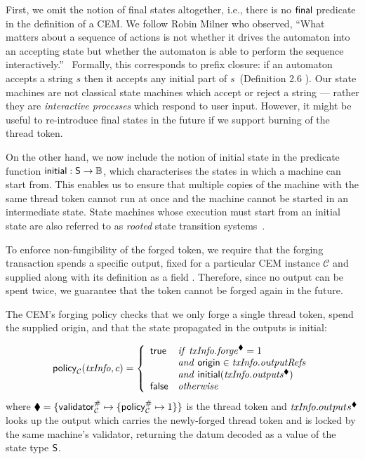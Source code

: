 First, we omit the notion of final states altogether, i.e., there is
no $\textsf{final}$ predicate in the definition of a CEM.
We follow Robin Milner who observed, ``What matters about a sequence of
actions is not whether it drives the automaton into an accepting state
but whether the automaton is able to perform the sequence
interactively.''~\cite{milner-pibook} Formally, this corresponds to
prefix closure: if an automaton accepts a string $s$ then it accepts
any initial part of $s$~(Definition 2.6 \cite{milner-pibook}). Our
state machines are not classical state machines which accept or
reject a string --- rather they are \emph{interactive processes} which
respond to user input.
However, it might be useful to re-introduce final states in the future if we support burning of the thread token.

On the other hand, we now include the notion of initial state in the
predicate function $\mathsf{initial} : \textsf{S} \rightarrow \mathbb{B}$, which characterises
the states in which a machine can start from. This enables us to ensure
that multiple copies of the machine with the same thread token cannot
run at once and the machine cannot be started in an intermediate state.
State machines whose execution must start from an initial state are also
referred to as \emph{rooted} state transition systems~\cite{TLSS}.

To enforce non-fungibility of the forged token, we require
that the forging transaction spends a specific output, fixed for a
particular CEM instance $\mathcal{C}$ and supplied along with its definition as a
field .  Therefore, since no output can be spent twice, we
guarantee that the token cannot be forged again in the future.

The CEM's forging policy checks that we only forge a single thread
token, spend the supplied origin, and that the state propagated in the
outputs is initial:

\begin{displaymath}
\mathsf{policy}_\mathcal{C}(\mathit{txInfo}, c) = \left\{
  \begin{array}{lll}
  \mathsf{true}  & \mathit{if} \ \mathit{txInfo}.\mathit{forge}^\blacklozenge = 1 \\
         & \mathit{and} \ \textsf{origin} \in \mathit{txInfo}.\mathit{outputRefs} \\
         & \mathit{and} \ \mathsf{initial}(\mathit{txInfo}.\mathit{outputs}^\blacklozenge) \\
  \textsf{false} & \mathit{otherwise}
  \end{array}
\right.
\end{displaymath}
%
where $\blacklozenge = \{\mathsf{validator}_\mathcal{C}^{\#} \mapsto \{ \mathsf{policy}_\mathcal{C}^{\#} \mapsto 1 \}\}$
is the thread token and $\mathit{txInfo}.outputs^\blacklozenge$ looks up the output
which carries the newly-forged thread token and is locked by the same
machine's validator, returning the datum decoded as a value of the
state type $\textsf{S}$.

